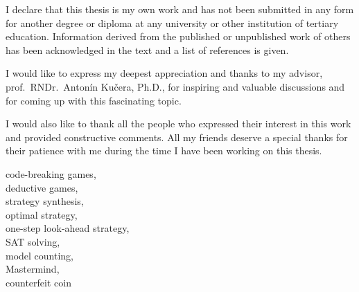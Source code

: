 

{}








\FrontMatter
\setlength{\parindent}{0pt}
\ThesisTitlePage


\begin{ThesisDeclaration}
I declare that this thesis is my own work and has not been submitted
in any form for another degree or diploma at any university or
other institution of tertiary education. Information derived from the published
or unpublished work of others has been acknowledged in the text
and a list of references is given.

\AdvisorName
\end{ThesisDeclaration}


\begin{ThesisThanks}
I would like to express my deepest appreciation and thanks to my advisor,
  prof.~RNDr.~Antonín Kučera, Ph.D.,
  for inspiring and valuable discussions and
  for coming up with this fascinating topic.

I would also like to thank all the people who
  expressed their interest in this work and provided
  constructive comments.
All my friends deserve a special thanks for their patience with me
 during the time I have been working on this thesis.
\end{ThesisThanks}


\begin{ThesisKeyWords}
code-breaking games, \\
deductive games,\\
strategy synthesis, \\
optimal strategy, \\
one-step look-ahead strategy,\\
SAT solving,\\
model counting, \\
Mastermind, \\
counterfeit coin\\
\end{ThesisKeyWords}


